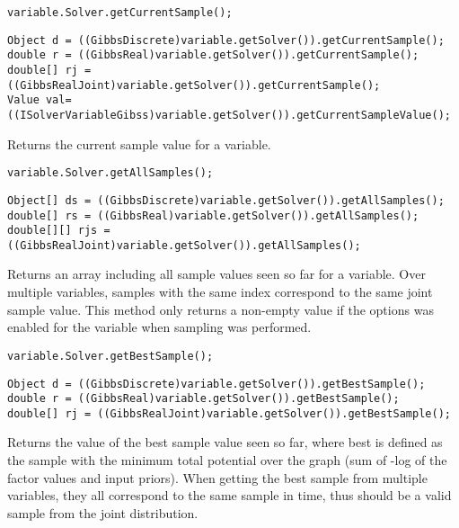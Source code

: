 
\ifmatlab
\begin{lstlisting}
variable.Solver.getCurrentSample();
\end{lstlisting}
\fi

\ifjava
\begin{lstlisting}
Object d = ((GibbsDiscrete)variable.getSolver()).getCurrentSample();
double r = ((GibbsReal)variable.getSolver()).getCurrentSample();
double[] rj = ((GibbsRealJoint)variable.getSolver()).getCurrentSample();
Value val= ((ISolverVariableGibss)variable.getSolver()).getCurrentSampleValue();
\end{lstlisting}
\fi

Returns the current sample value for a variable.

\ifmatlab
\begin{lstlisting}
variable.Solver.getAllSamples();
\end{lstlisting}
\fi

\ifjava
\begin{lstlisting}
Object[] ds = ((GibbsDiscrete)variable.getSolver()).getAllSamples();
double[] rs = ((GibbsReal)variable.getSolver()).getAllSamples();
double[][] rjs = ((GibbsRealJoint)variable.getSolver()).getAllSamples();
\end{lstlisting}
\fi

Returns an array including all sample values seen so far for a variable. Over multiple variables, samples with the same index correspond to the same joint sample value. This method only returns a non-empty value if the  options was enabled for the variable when sampling was performed.

\ifmatlab
\begin{lstlisting}
variable.Solver.getBestSample();
\end{lstlisting}
\fi

\ifjava
\begin{lstlisting}
Object d = ((GibbsDiscrete)variable.getSolver()).getBestSample();
double r = ((GibbsReal)variable.getSolver()).getBestSample();
double[] rj = ((GibbsRealJoint)variable.getSolver()).getBestSample();
\end{lstlisting}
\fi


Returns the value of the best sample value seen so far, where best is defined as the sample with the minimum total potential over the graph (sum of -log of the factor values and input priors).  When getting the best sample from multiple variables, they all correspond to the same sample in time, thus should be a valid sample from the joint distribution.

